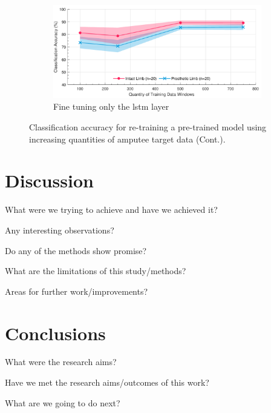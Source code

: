 \begin{figure}[t]\ContinuedFloat
    \centering
    \begin{subfigure}{\textwidth}
        \includegraphics[width=\textwidth]{content/6-Amputee/ch6_frozen_dense_layer_accuracy.pdf}
        \caption{Fine tuning only the \acrshort{lstm} layer}
    \end{subfigure}
    \caption[]{Classification accuracy for re-training a pre-trained model using increasing quantities of amputee target data (Cont.).}
\end{figure}


\section{Discussion}
What were we trying to achieve and have we achieved it?

Any interesting observations?

Do any of the methods show promise?


What are the limitations of this study/methods?

Areas for further work/improvements?
\section{Conclusions}
What were the research aims?

Have we met the research aims/outcomes of this work?

What are we going to do next?